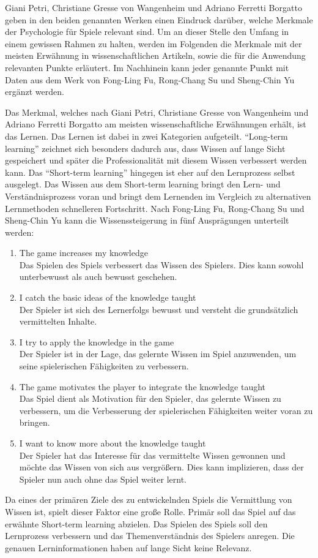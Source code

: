 	Giani Petri, Christiane Gresse von Wangenheim und Adriano Ferretti Borgatto geben in den beiden genannten Werken einen Eindruck darüber, welche Merkmale der Psychologie für Spiele relevant sind. Um an dieser Stelle den Umfang in einem gewissen Rahmen zu halten, werden im Folgenden die Merkmale mit der meisten Erwähnung in wissenschaftlichen Artikeln, sowie die für die Anwendung relevanten Punkte erläutert. Im Nachhinein kann jeder genannte Punkt mit Daten aus dem Werk von Fong-Ling Fu, Rong-Chang Su und Sheng-Chin Yu ergänzt werden.

	Das Merkmal, welches nach Giani Petri, Christiane Gresse von Wangenheim und Adriano Ferretti Borgatto am meisten wissenschaftliche Erwähnungen erhält, ist das Lernen. Das Lernen ist dabei in zwei Kategorien aufgeteilt. \enquote{Long-term learning} zeichnet sich besonders dadurch aus, dass Wissen auf lange Sicht gespeichert und später die Professionalität mit diesem Wissen verbessert werden kann. Das \enquote{Short-term learning} hingegen ist eher auf den Lernprozess selbst ausgelegt. Das Wissen aus dem Short-term learning bringt den Lern- und Verständnisprozess voran und bringt dem Lernenden im Vergleich zu alternativen Lernmethoden schnelleren Fortschritt. Nach Fong-Ling Fu, Rong-Chang Su und Sheng-Chin Yu kann die Wissenssteigerung in fünf Ausprägungen unterteilt werden:
	\begin{enumerate}
		\item{The game increases my knowledge} \hfill \\
		Das Spielen des Spiels verbessert das Wissen des Spielers. Dies kann sowohl unterbewusst als auch bewusst geschehen.
		\item{I catch the basic ideas of the knowledge taught} \hfill \\
		Der Spieler ist sich des Lernerfolgs bewusst und versteht die grundsätzlich vermittelten Inhalte.
		\item{I try to apply the knowledge in the game}\hfill \\
		Der Spieler ist in der Lage, das gelernte Wissen im Spiel anzuwenden, um seine spielerischen Fähigkeiten zu verbessern.
		\item{The game motivates the player to integrate the knowledge taught}\hfill \\
		Das Spiel dient als Motivation für den Spieler, das gelernte Wissen zu verbessern, um die Verbesserung der spielerischen Fähigkeiten weiter voran zu bringen.
		\item{I want to know more about the knowledge taught}\hfill \\
		Der Spieler hat das Interesse für das vermittelte Wissen gewonnen und möchte das Wissen von sich aus vergrößern. Dies kann implizieren, dass der Spieler nun auch ohne das Spiel weiter lernt.
	\end{enumerate}
	Da eines der primären Ziele des zu entwickelnden Spiels die Vermittlung von Wissen ist, spielt dieser Faktor eine große Rolle. Primär soll das Spiel auf das erwähnte Short-term learning abzielen. Das Spielen des Spiels soll den Lernprozess verbessern und das Themenverständnis des Spielers anregen. Die genauen Lerninformationen haben auf lange Sicht keine Relevanz.

